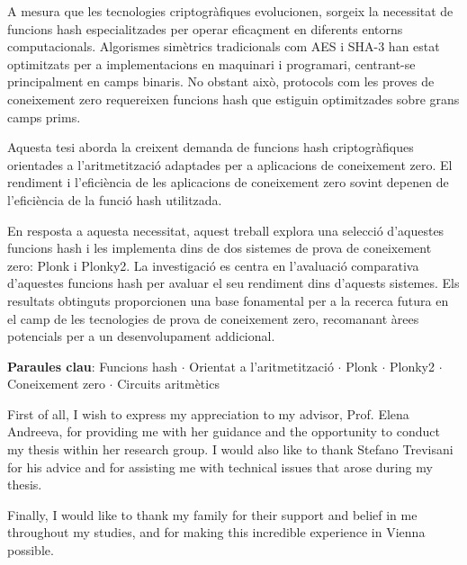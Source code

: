 \documentclass[draft,final]{vutinfth} %
\begin{document}
\begin{resum*}
A mesura que les tecnologies criptogràfiques evolucionen, sorgeix la necessitat de funcions hash especialitzades per operar eficaçment en diferents entorns computacionals. Algorismes simètrics tradicionals com AES i SHA-3 han estat optimitzats per a implementacions en maquinari i programari, centrant-se principalment en camps binaris. No obstant això, protocols com les proves de coneixement zero requereixen funcions hash que estiguin optimitzades sobre grans camps prims.

Aquesta tesi aborda la creixent demanda de funcions hash criptogràfiques orientades a l'aritmetització adaptades per a aplicacions de coneixement zero. El rendiment i l'eficiència de les aplicacions de coneixement zero sovint depenen de l'eficiència de la funció hash utilitzada.
    
En resposta a aquesta necessitat, aquest treball explora una selecció d'aquestes funcions hash i les implementa dins de dos sistemes de prova de coneixement zero: Plonk i Plonky2. La investigació es centra en l'avaluació comparativa d'aquestes funcions hash per avaluar el seu rendiment dins d'aquests sistemes. Els resultats obtinguts proporcionen una base fonamental per a la recerca futura en el camp de les tecnologies de prova de coneixement zero, recomanant àrees potencials per a un desenvolupament addicional.

\textbf{Paraules clau}: Funcions hash $\cdot$ Orientat a l'aritmetització $\cdot$ Plonk $\cdot$ Plonky2 $\cdot$ Coneixement zero $\cdot$ Circuits aritmètics
\end{resum*}

\begin{acknowledgements*}
First of all, I wish to express my appreciation to my advisor, Prof. Elena Andreeva, for providing me with her guidance and the opportunity to conduct my thesis within her research group. I would also like to thank Stefano Trevisani for his advice and for assisting me with technical issues that arose during my thesis.

Finally, I would like to thank my family for their support and belief in me throughout my studies, and for making this incredible experience in Vienna possible.
\end{acknowledgements*}


\setcounter{tocdepth}{2}
\tableofcontents %
\end{document}
